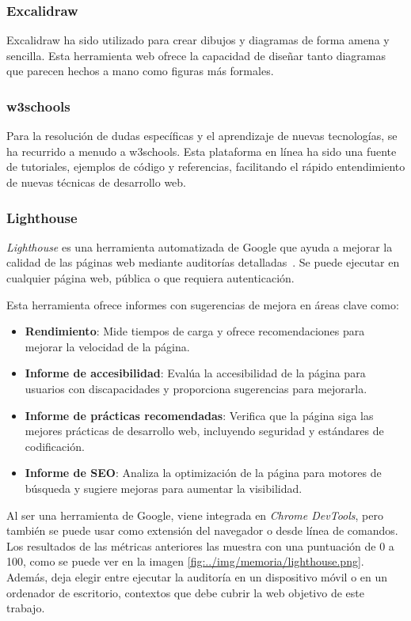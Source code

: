 \subsubsection{Excalidraw}
Excalidraw ha sido utilizado para crear dibujos y diagramas de forma amena y sencilla. Esta herramienta web ofrece la capacidad de diseñar tanto diagramas que parecen hechos a mano como figuras más formales.

\subsubsection{w3schools}
Para la resolución de dudas específicas y el aprendizaje de nuevas tecnologías, se ha recurrido a menudo a w3schools. Esta plataforma en línea ha sido una fuente de tutoriales, ejemplos de código y referencias, facilitando el rápido entendimiento de nuevas técnicas de desarrollo web.

\subsubsection{Lighthouse}
\textit{Lighthouse} es una herramienta automatizada de Google que ayuda a mejorar la calidad de las páginas web mediante auditorías detalladas~\cite{web:lighthouse}. Se puede ejecutar en cualquier página web, pública o que requiera autenticación.

Esta herramienta ofrece informes con sugerencias de mejora en áreas clave como:
\begin{itemize}
	\item \textbf{Rendimiento}: Mide tiempos de carga y ofrece recomendaciones para mejorar la velocidad de la página.
	\item \textbf{Informe de accesibilidad}: Evalúa la accesibilidad de la página para usuarios con discapacidades y proporciona sugerencias para mejorarla.
	\item \textbf{Informe de prácticas recomendadas}: Verifica que la página siga las mejores prácticas de desarrollo web, incluyendo seguridad y estándares de codificación.
	\item \textbf{Informe de SEO}: Analiza la optimización de la página para motores de búsqueda y sugiere mejoras para aumentar la visibilidad.
\end{itemize}

Al ser una herramienta de Google, viene integrada en \textit{Chrome DevTools}, pero también se puede usar como extensión del navegador o desde línea de comandos. Los resultados de las métricas anteriores las muestra con una puntuación de 0 a 100, como se puede ver en la imagen \ref{fig:../img/memoria/lighthouse.png}. Además, deja elegir entre ejecutar la auditoría en un dispositivo móvil o en un ordenador de escritorio, contextos que debe cubrir la web objetivo de este trabajo.

